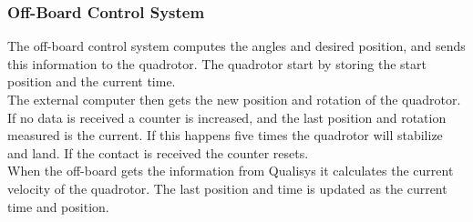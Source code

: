 \subsubsection{Off-Board Control System}
The off-board control system computes the angles and desired position, and sends this information to the quadrotor. The quadrotor start by storing the start position and the current time. \\
The external computer then gets the new position and rotation of the quadrotor. If no data is received a counter is increased, and the last position and rotation measured is the current. If this happens five times the quadrotor will stabilize and land. If the contact is received the counter resets. \\
When the off-board gets the information from Qualisys it calculates the current velocity of the quadrotor. The last position and time is updated as the current time and position. \\
\\

